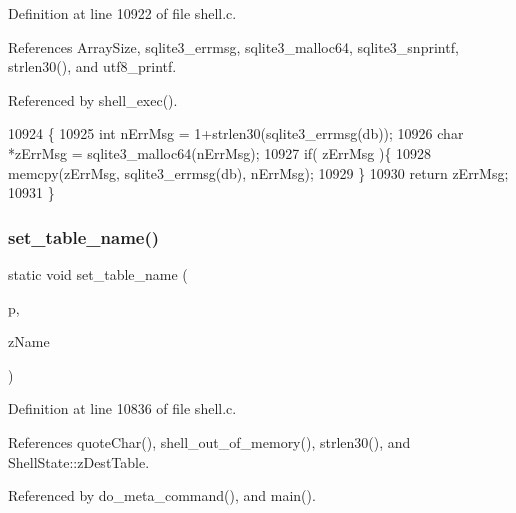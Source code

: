 Definition at line 10922 of file shell.\+c.



References Array\+Size, sqlite3\+\_\+errmsg, sqlite3\+\_\+malloc64, sqlite3\+\_\+snprintf, strlen30(), and utf8\+\_\+printf.



Referenced by shell\+\_\+exec().


\begin{DoxyCode}
10924  \{
10925   \textcolor{keywordtype}{int} nErrMsg = 1+strlen30(sqlite3_errmsg(db));
10926   \textcolor{keywordtype}{char} *zErrMsg = sqlite3_malloc64(nErrMsg);
10927   \textcolor{keywordflow}{if}( zErrMsg )\{
10928     memcpy(zErrMsg, sqlite3_errmsg(db), nErrMsg);
10929   \}
10930   \textcolor{keywordflow}{return} zErrMsg;
10931 \}
\end{DoxyCode}
\mbox{\label{shell_8c_ad2a08f83f795b3fae1fea7594eaeed4f}} 
\subsubsection{set\+\_\+table\+\_\+name()}
{\footnotesize\ttfamily static void set\+\_\+table\+\_\+name (\begin{DoxyParamCaption}\item[{\textbf{ Shell\+State} $\ast$}]{p,  }\item[{const char $\ast$}]{z\+Name }\end{DoxyParamCaption})\hspace{0.3cm}{\ttfamily [static]}}



Definition at line 10836 of file shell.\+c.



References quote\+Char(), shell\+\_\+out\+\_\+of\+\_\+memory(), strlen30(), and Shell\+State\+::z\+Dest\+Table.



Referenced by do\+\_\+meta\+\_\+command(), and main().



